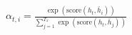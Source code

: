 \documentclass[preview]{standalone}
\begin{document}
\begin{align*}
\alpha_{t,i} = \frac{\exp(\text{score}(h_t, \bar{h}_i))}{\sum_{j=1}^{T_x} \exp(\text{score}(h_t, \bar{h}_j))}
\end{align*}
\end{document}
